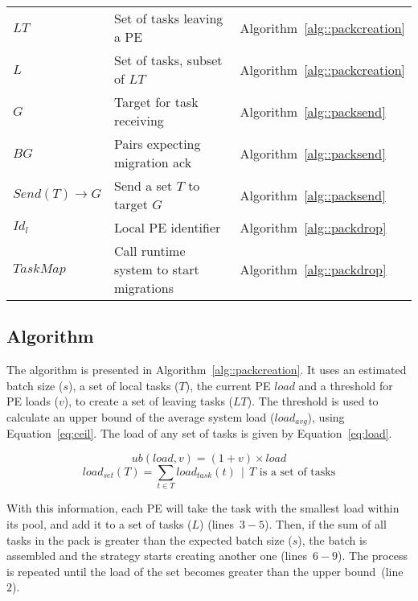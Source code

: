 \begin{table}[t]
{\begin{tabular}{l l l}
		$LT$				& Set of tasks leaving a PE 							& Algorithm~\ref{alg::packcreation} \\
		$L$				& Set of tasks, subset of $LT$						& Algorithm~\ref{alg::packcreation} \\
		$G$				& Target for task receiving							& Algorithm~\ref{alg::packsend} \\
		$BG$				& Pairs expecting migration ack						& Algorithm~\ref{alg::packsend} \\ 
		$Send(T)\rightarrow G $ & Send a set $T$ to target $G$				& Algorithm~\ref{alg::packsend} \\ 
		$Id_l$ 			& Local PE identifier								& Algorithm~\ref{alg::packdrop} \\
		$TaskMap$		& Call runtime system to start migrations					& Algorithm~\ref{alg::packdrop} \\
		\bottomrule
	\end{tabular}
	}
	\label{tab:algo:symbols}
\end{table}

\subsection{\batchassembly Algorithm} \label{sec:algo:creation}

The \batchassembly algorithm is presented in Algorithm~\ref{alg::packcreation}.
It uses an estimated batch size ($s$), a set of local tasks ($T$), the current PE $load$ and a threshold for PE loads ($v$), to create a set of leaving tasks ($LT$).
The threshold is used to calculate an upper bound of the average system load ($load_{avg}$), using Equation~\ref{eq:ceil}. 
The load of any set of tasks is given by Equation~\ref{eq:load}.

\begin{equation}
	ub(load,v) = (1+v)\times load
    \label{eq:ceil}
\end{equation}
\begin{equation}
	load_{set}(T) = \sum_{t \in T}{load_{task}(t)}\ \ |\ \ T \text{ is a set of tasks}
	\label{eq:load}
\end{equation}

With this information, each PE will take the task with the smallest load within its pool, and add it to a set of tasks ($L$) (lines~$3-5$).
Then, if the sum of all tasks in the pack is greater than the expected batch size ($s$), the batch is assembled and the strategy starts creating another one (lines~$6-9$).
The process is repeated until the load of the set becomes greater than the upper bound~(line~$2$).

